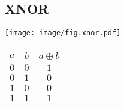 \begin{multicols}{4}
	\subsection*{XNOR}
	\begin{minipage}[t][2em][c]{\linewidth}
		\centering
		\texttt{[image: image/fig.xnor.pdf]}
	\end{minipage}
	\begin{center}
		\begin{tabular}{cc|c}
			\toprule
			$a$ & $b$ & $\overline{a \oplus b}$ \\
			\midrule
			$0$ & $0$ & $1$                     \\
			$0$ & $1$ & $0$                     \\
			$1$ & $0$ & $0$                     \\
			$1$ & $1$ & $1$                     \\
			\bottomrule
		\end{tabular}
	\end{center}

\end{multicols}
